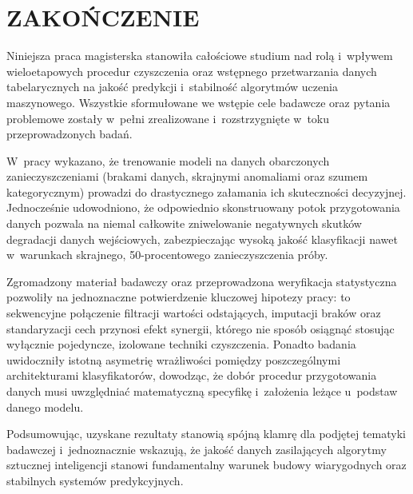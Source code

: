\chapter*{ZAKOŃCZENIE}

Niniejsza praca magisterska stanowiła całościowe studium nad rolą i~wpływem wieloetapowych procedur czyszczenia oraz wstępnego przetwarzania danych tabelarycznych na jakość predykcji i~stabilność algorytmów uczenia maszynowego. Wszystkie sformułowane we wstępie cele badawcze oraz pytania problemowe zostały w~pełni zrealizowane i~rozstrzygnięte w~toku przeprowadzonych badań.

W~pracy wykazano, że trenowanie modeli na danych obarczonych zanieczyszczeniami (brakami danych, skrajnymi anomaliami oraz szumem kategorycznym) prowadzi do drastycznego załamania ich skuteczności decyzyjnej. Jednocześnie udowodniono, że odpowiednio skonstruowany potok przygotowania danych pozwala na niemal całkowite zniwelowanie negatywnych skutków degradacji danych wejściowych, zabezpieczając wysoką jakość klasyfikacji nawet w~warunkach skrajnego, 50-procentowego zanieczyszczenia próby.

Zgromadzony materiał badawczy oraz przeprowadzona weryfikacja statystyczna pozwoliły na jednoznaczne potwierdzenie kluczowej hipotezy pracy: to sekwencyjne połączenie filtracji wartości odstających, imputacji braków oraz standaryzacji cech przynosi efekt synergii, którego nie sposób osiągnąć stosując wyłącznie pojedyncze, izolowane techniki czyszczenia. Ponadto badania uwidoczniły istotną asymetrię wrażliwości pomiędzy poszczególnymi architekturami klasyfikatorów, dowodząc, że dobór procedur przygotowania danych musi uwzględniać matematyczną specyfikę i~założenia leżące u~podstaw danego modelu.

Podsumowując, uzyskane rezultaty stanowią spójną klamrę dla podjętej tematyki badawczej i~jednoznacznie wskazują, że jakość danych zasilających algorytmy sztucznej inteligencji stanowi fundamentalny warunek budowy wiarygodnych oraz stabilnych systemów predykcyjnych.
